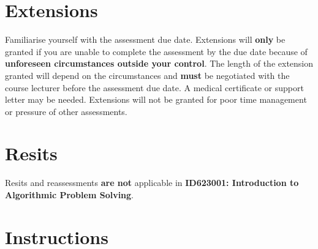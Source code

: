 \documentclass{article}
\begin{document}
\section*{Extensions}
Familiarise yourself with the assessment due date. Extensions will \textbf{only} be granted if you are unable to complete the assessment by the due date because of \textbf{unforeseen circumstances outside your control}. The length of the extension granted will depend on the circumstances and \textbf{must} be negotiated with the course lecturer before the assessment due date. A medical certificate or support letter may be needed. Extensions will not be granted for poor time management or pressure of other assessments.

\section*{Resits}
Resits and reassessments \textbf{are not} applicable in \textbf{ID623001: Introduction to Algorithmic Problem Solving}.

\section*{Instructions}
\end{document}
